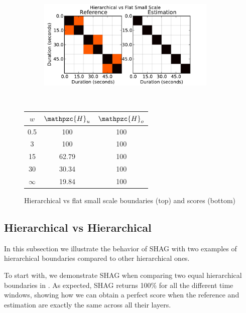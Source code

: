 \documentclass{article}
\def\shag{\ensuremath{\mathpzc{H}}}
\begin{document}
\begin{figure}[t]
  \centering
  \begin{subfigure}{0.5\textwidth}
    \centering
    \includegraphics[width=0.94\textwidth]{plots/hier-flatsmall.pdf}
  \end{subfigure}%
  \\
  \begin{minipage}{0.5\textwidth}
    \centering
    \vspace{10pt}
    \begin{tabular}{|c|c|c|}
      \hline
      $w$       & $\shag_u$    & $\shag_o$      \\
      \hline
      0.5       & 100       & 100      \\     
      3         & 100       & 100      \\
      15        & 62.79     & 100    \\
      30        & 30.34     & 100    \\
      $\infty$  & 19.84     & 100    \\
      \hline
    \end{tabular}
  \end{minipage}
  \caption{Hierarchical vs flat small scale boundaries (top) and scores (bottom)}
  \label{fig:hier-flatsmall}
\end{figure}

\subsection{Hierarchical vs Hierarchical}

In this subsection we illustrate the behavior of SHAG with two examples of hierarchical boundaries compared to other hierarchical ones.

To start with, we demonstrate SHAG when comparing two equal hierarchical boundaries in .
As expected, SHAG returns 100\% for all the different time windows, showing how we can obtain a perfect score when the reference and 
estimation are exactly the same across all their layers.
\end{document}
